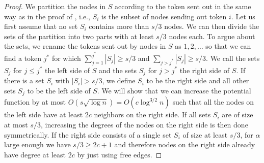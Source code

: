 \documentclass{llncs}
\begin{document}
\begin{proof}
    We partition the nodes in $S$ according to the token sent out in
    the same way as in the proof of , i.e., $S_i$ is
    the subset of nodes sending out token $i$. Let us first assume
    that no set $S_i$ contains more than $s/3$ nodes. We can then
    divide the sets of the partition into two parts with at least
    $s/3$ nodes each. To argue about the sets, we rename the tokens
    sent out by nodes in $S$ as $1,2,\dots$ so that we can find a
    token $j^*$ for which $\sum_{j=1}^{j^*}|S_j|\geq s/3$ and
    $\sum_{j>j^*}|S_j|\geq s/3$. We call the sets $S_j$ for $j\leq
    j^*$ the left side of $S$ and the sets $S_j$ for $j>j^*$ the right
    side of $S$. If there is a set $S_i$ with $|S_i|>s/3$, we define
    $S_i$ to be the right side and all other sets $S_j$ to be the left
    side of $S$. We will show that we can increase the potential
    function by at most $O(s\sqrt{\log n})=O(c\log^{3/2}n)$ such that
    all the nodes on the left side have at least $2c$ neighbors on the
    right side. If all sets $S_i$ are of size at most $s/3$,
    increasing the degrees of the nodes on the right side is then done
    symmetrically. If the right side consists of a single set $S_i$ of
    size at least $s/3$, for $\alpha$ large enough we have $s/3\geq
    2c+1$ and therefore nodes on the right side already have degree at
    least $2c$ by just using free edges.


\end{proof}
\end{document}
